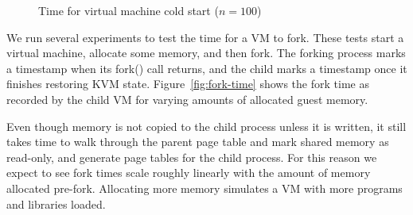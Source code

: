 \begin{figure}[t]


  \caption{Time for virtual machine cold start ($n = 100$)}
  \label{fig:boot-time}
\end{figure}


We run several experiments to test the time for a VM to fork. These tests start
a virtual machine, allocate some memory, and then fork.  The forking process
marks a timestamp when its fork() call returns, and the child marks a timestamp
once it finishes restoring KVM state.  Figure~\ref{fig:fork-time} shows the
fork time as recorded by the child VM for varying amounts of allocated guest
memory.

Even though memory is not copied to the child process unless it is written, it
still takes time to walk through the parent page table and mark shared memory
as read-only, and generate page tables for the child process. For this reason
we expect to see fork times scale roughly linearly with the amount of memory
allocated pre-fork. Allocating more memory simulates a VM with more programs
and libraries loaded.

